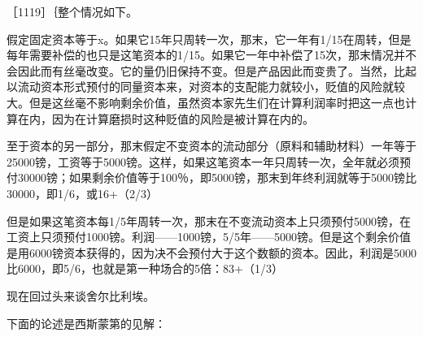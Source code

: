 ［1119］｛整个情况如下。

假定固定资本等于x。如果它15年只周转一次，那末，它一年有1/15在周转，但是每年需要补偿的也只是这笔资本的1/15。如果它一年中补偿了15次，那末情况并不会因此而有丝毫改变。它的量仍旧保持不变。但是产品因此而变贵了。当然，比起以流动资本形式预付的同量资本来，对资本的支配能力就较小，贬值的风险就较大。但是这丝毫不影响剩余价值，虽然资本家先生们在计算利润率时把这一点也计算在内，因为在计算磨损时这种贬值的风险是被计算在内的。

至于资本的另一部分，那末假定不变资本的流动部分（原料和辅助材料）一年等于25000镑，工资等于5000镑。这样，如果这笔资本一年只周转一次，全年就必须预付30000镑；如果剩余价值等于100％，即5000镑，那末到年终利润就等于5000镑比30000，即1/6，或16+（2/3）%

但是如果这笔资本每1/5年周转一次，那末在不变流动资本上只须预付5000镑，在工资上只须预付1000镑。利润——1000镑，5/5年——5000镑。但是这个剩余价值是用6000镑资本获得的，因为决不会预付大于这个数额的资本。因此，利润是5000比6000，即5/6，也就是第一种场合的5倍：83+（1/3）%


现在回过头来谈舍尔比利埃。

下面的论述是西斯蒙第的见解：


